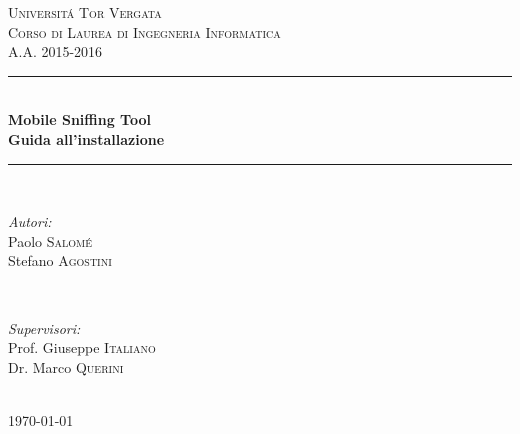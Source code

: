 \documentclass[12pt]{article} %
\begin{document}

\begin{titlepage}

\newcommand{\HRule}{\rule{\linewidth}{0.5mm}} %

\center %

\textsc{\LARGE Universit\'a Tor Vergata}\\[1.5cm] %
\textsc{\Large Corso di Laurea di Ingegneria Informatica}\\[0.5cm] %
\textsc{\large A.A. 2015-2016}\\[0.5cm] %

\HRule \\[0.4cm]
{ \huge \bfseries Mobile Sniffing Tool}\\[0.4cm] %
{ \bfseries Guida all'installazione}\\[0,4cm]
\HRule \\[1.5cm]

\begin{minipage}{0.4\textwidth}
\begin{flushleft} \large
\emph{Autori:}\\
Paolo \textsc{Salom\'e}\\
Stefano \textsc{Agostini} %
\end{flushleft}
\end{minipage}
~
\begin{minipage}{0.4\textwidth}
\begin{flushright} \large
\emph{Supervisori:}\\
Prof. Giuseppe \textsc{Italiano}\\ 
Dr. Marco \textsc{Querini}  %
\end{flushright}
\end{minipage}\\[8,5cm]

{\large \today}\\[3cm] %


\vfill %

\end{titlepage}
\end{document}
